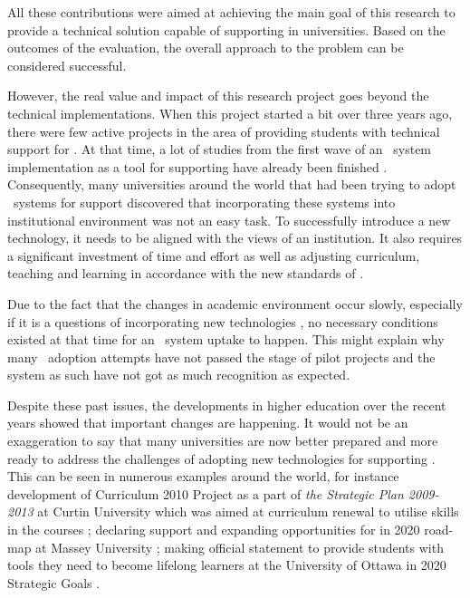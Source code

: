 All these contributions were aimed at achieving the main goal of this research
to provide a technical solution capable of supporting \LLLs in universities.
Based on the outcomes of the evaluation, the overall approach to the problem can
be considered successful.

However, the real value and impact of this research project goes beyond the
technical implementations. When this project started a bit over three years ago,
there were few active projects in the area of providing students with technical
support for \LLLsn. At that time, a lot of studies from the first wave of an
\ep~system implementation as a tool for supporting \LLLs have already been
finished \citep{Batson2010}. Consequently, many universities around the world
that had been trying to adopt \ep~systems for \LLLs support discovered that
incorporating these systems into institutional environment was not an easy task.
To successfully introduce a new technology, it needs to be aligned with the
views of an institution. It also requires a significant investment of time and
effort as well as adjusting curriculum, teaching and learning in accordance with
the new standards of \LLLsn.

Due to the fact that the changes in academic environment occur slowly,
especially if it is a questions of incorporating new technologies
\citep{Molebash1999}, no necessary conditions existed at that time for an
\ep~system uptake to happen. This might explain why many \ep~adoption attempts
have not passed the stage of pilot projects and the system as such have not got
as much recognition as expected.

Despite these past issues, the developments in higher education over the recent
years showed that important changes are happening. It would not be an
exaggeration to say that many universities are now better prepared and more
ready to address the challenges of adopting new technologies for supporting
\LLLsn. This can be seen in numerous examples around the world, for instance
development of Curriculum 2010 Project as a part of \textit{the Strategic Plan
2009-2013} at Curtin University which was aimed at curriculum renewal to utilise
\LLLs skills in the courses \citep{Oliver2007}; declaring support and expanding
opportunities for \LLLs in 2020 road-map at Massey University
\citep{MasseyUniversity2012}; making official statement to provide students with
tools they need to become lifelong learners at the University of Ottawa in 2020
Strategic Goals \citep{UniversityofOttawa2005}.

